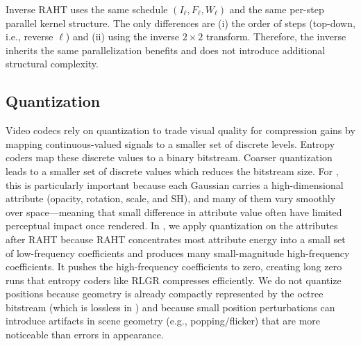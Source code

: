 Inverse RAHT uses the same schedule $(I_\ell,F_\ell,W_\ell)$ and the same per-step parallel kernel structure.
%
The only differences are (i) the order of steps (top-down, i.e., reverse $\ell$) and (ii) using the inverse $2\times2$ transform.
%
Therefore, the inverse inherits the same parallelization benefits and does not introduce additional structural complexity.

\subsection{Quantization}\label{sec:quantization}
Video codecs rely on quantization to trade visual quality for compression gains by mapping continuous-valued signals to a smaller set of discrete levels.
%
Entropy coders map these discrete values to a binary bitstream. Coarser  quantization leads to a  smaller  set of discrete values which reduces the bitstream size.
%
For \gs, this is particularly important because each Gaussian carries a high-dimensional attribute (opacity, rotation, scale, and SH), and many of them vary smoothly over space---meaning that small difference in attribute value often have limited perceptual impact once rendered.
%
In \gsnfs, we apply quantization on the attributes after RAHT because RAHT concentrates most attribute energy into a small set of low-frequency coefficients and produces many small-magnitude high-frequency coefficients.
%
It pushes the high-frequency coefficients to zero, creating long zero runs that entropy coders like RLGR compresses efficiently.
%
We do not quantize positions because geometry is already compactly represented by the octree bitstream (which is lossless in \gsnfs) and because small position perturbations can introduce artifacts in scene geometry (e.g., popping/flicker) that are more noticeable than errors in appearance.

